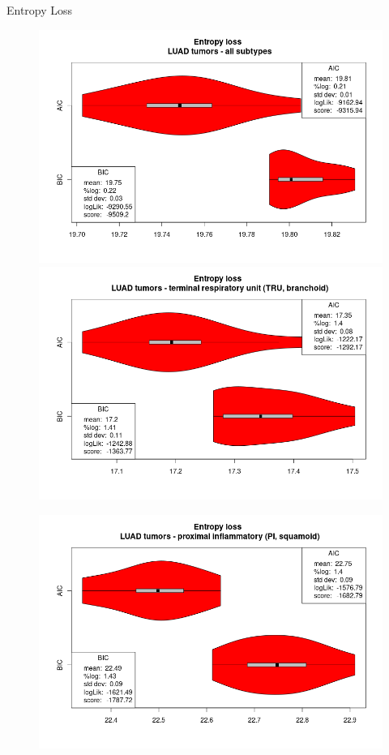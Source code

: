 \documentclass{beamer}
\begin{document}
\begin{frame}{Entropy Loss}
  \begin{figure}
    \centering
    \includegraphics[scale = 0.215]{img/vioplot_ALL.png}
    \includegraphics[scale = 0.215]{img/vioplot_TRU.png}
  \end{figure}
  \begin{figure}
    \centering
    \includegraphics[scale = 0.215]{img/vioplot_PI.png}

\end{figure}
\end{frame}
\end{document}
